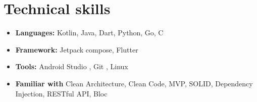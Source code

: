 \documentclass[a4paper,10pt]{article} %
\begin{document}
\section{Technical skills} 

\begin{itemize}
    \item \textbf{Languages: } Kotlin, Java, Dart, Python, Go, C
    \item \textbf{Framework: } Jetpack compose, Flutter
    \item \textbf{Tools: } Android Studio , Git , Linux
    \item \textbf{Familiar with} Clean Architecture, Clean Code, MVP, SOLID, Dependency Injection, RESTful API, Bloc
\end{itemize}
\end{document}
